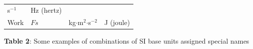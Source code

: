 {{\begin{center}
\begin{tabular}[t]{|l|l|l|l|}
        s\begin{math}{}^{-1}\end{math} &
    
    
        Hz (hertz)%
     \tabularnewline\cline{1-1}\cline{2-2}\cline{3-3}\cline{4-4}
    
    
        Work &
    
    
        
                \begin{math}Fs\end{math}
               &
    
    
        kg\begin{math}\ensuremath{\cdot}\end{math}m\begin{math}{}^{2}\end{math}\begin{math}\ensuremath{\cdot}\end{math}s\begin{math}{}^{-2}\end{math} &
    
    
        J (joule)%
     \tabularnewline\cline{1-1}\cline{2-2}\cline{3-3}\cline{4-4}
    \end{tabular}
      \end{center}
    \begin{center}{\small\bfseries Table 2}: Some examples of combinations of SI base units assigned
special names\end{center}
    
}}
